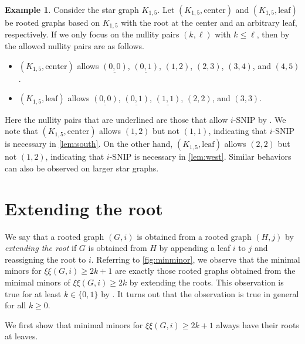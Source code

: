 \documentclass{article}
\theoremstyle{definition}
\newtheorem{example}[theorem]{Example}
\newcommand{\excise}{\xi\xi}
\begin{document}
\begin{example}
\label{ex:bifurstar}
Consider the star graph $K_{1,5}$.  Let $(K_{1,5}, \text{center})$ and $(K_{1,5}, \text{leaf})$ be rooted graphs based on $K_{1,5}$ with the root at the center and an arbitrary leaf, respectively.  If we only focus on the nullity pairs $(k,\ell)$ with $k\leq \ell$, then by \cite[Proposition~4.6]{SNIP} the allowed nullity pairs are as follows.
\begin{itemize}
\item $(K_{1,5}, \text{center})$ allows $\underline{(0,0)}$, $\underline{(0,1)}$, $(1,2)$, $(2,3)$, $(3,4)$, and $(4,5)$.
\item $(K_{1,5}, \text{leaf})$ allows $\underline{(0,0)}$, $\underline{(0,1)}$, $\underline{(1,1)}$, $(2,2)$, and $(3,3)$.
\end{itemize}
Here the nullity pairs that are underlined are those that allow $i$-SNIP by \cite[Theorem~5.12]{SNIP}.  We note that $(K_{1,5}, \text{center})$ allows $(1,2)$ but not $(1,1)$, indicating that $i$-SNIP is necessary in \cref{lem:south}.
On the other hand, $(K_{1,5}, \text{leaf})$ allows $(2,2)$ but not $(1,2)$, indicating that $i$-SNIP is necessary in \cref{lem:west}.  Similar behaviors can also be observed on larger star graphs.
\end{example}

\section{Extending the root}
\label{sec:append}
We say that a rooted graph $(G,i)$ is obtained from a rooted graph $(H,j)$ by \emph{extending the root} if $G$ is obtained from $H$ by appending a leaf $i$ to $j$ and reassigning the root to $i$.  
Referring to \cref{fig:minminor}, we observe that the minimal minors for $\excise(G, i) \geq 2k + 1$ are exactly those rooted graphs obtained from the minimal minors of $\excise(G, i) \geq 2k$ by extending the roots.  This observation is true for at least $k \in \{ 0, 1\}$ by \cite{SNIP}.
It turns out that the observation is true in general for all $k \geq 0$.

We first show that minimal minors for $\excise(G, i) \geq 2k + 1$ always have their roots at leaves.
\end{document}

